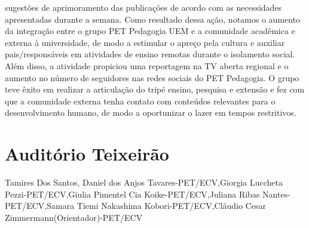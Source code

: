 sugestões de aprimoramento das publicações de acordo com as necessidades apresentadas durante 
a semana. Como resultado dessa ação, notamos o aumento da integração entre o grupo PET 
Pedagogia UEM e a comunidade acadêmica e externa à universidade, de modo a estimular o apreço 
pela cultura e auxiliar pais/responsáveis em atividades de ensino remotas durante o isolamento 
social. Além disso, a atividade propiciou uma reportagem na TV aberta regional e o aumento no 
número de seguidores nas redes sociais do PET Pedagogia. O grupo teve êxito em realizar a 
articulação do tripé ensino, pesquisa e extensão e fez com que a comunidade externa tenha contato 
com conteúdos relevantes para o desenvolvimento humano, de modo a oportunizar o lazer em 
tempos restritivos.



\section{Auditório Teixeirão}

Tamires Dos Santos, Daniel dos Anjos Tavares-PET/ECV,Giorgia Luccheta Pezzi-PET/ECV,Giulia Pimentel Cia Koike-PET/ECV,Juliana Ribas Nantes-PET/ECV,Samara Tiemi Nakashima Kobori-PET/ECV,Cláudio Cesar Zimmermann(Orientador)-PET/ECV

